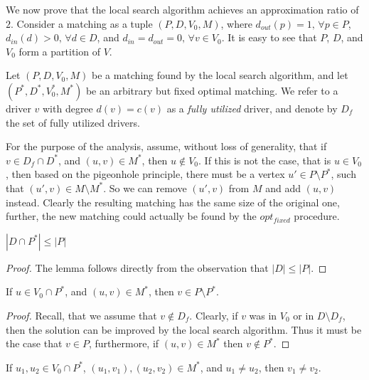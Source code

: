 We now prove that the local search algorithm achieves an approximation ratio of
$2$.
Consider a matching as a tuple $(P, D, V_0, M)$, 
where $d_{out}(p) = 1, \, \forall p \in P$,
$d_{in}(d) > 0, \, \forall d \in D$,
and $d_{in} = d_{out} = 0, \, \forall v \in V_0$.
It is easy to see that $P$, $D$, and $V_0$ form a partition of $V$.

Let $(P, D, V_0, M)$ be a matching found by the local search algorithm, and let
$(P^*, D^*, V^*_0, M^*)$ be an arbitrary but fixed optimal matching.
We refer to a driver $v$ with degree $d(v) = c(v)$ as a \emph{fully utilized}
driver, and denote by $D_f$ the set of fully utilized drivers.

For the purpose of the analysis, assume, without loss of generality, that
if $v \in D_f \cap D^*$, and $(u, v) \in M^*$, then $u \notin V_0$.
If this is not the case, that is $u \in V_0$, then based on the pigeonhole principle,
there must be a vertex $u' \in P \setminus P^*$, such that $(u', v) \in M \setminus M^*$.
So we can remove $(u', v)$ from $M$ and add $(u, v)$ instead.
Clearly the resulting matching has the same size of the original one,
further, the new matching could actually be found by the $opt_{fixed}$ procedure.


\begin{lemma}
\label{lm:dleqp}
$|D \cap P^*| \leq |P|$
\end{lemma}

\begin{proof}
The lemma follows directly from the observation that 
${|D| \leq |P|}$.
\end{proof}

\begin{lemma}
\label{lm:v_in_p}
If $u \in V_0 \cap P^*$, and $(u, v) \in M^*$, then $v \in P \setminus P^*$.
\end{lemma}

\begin{proof}
Recall, that we assume that $v \notin D_f$.
Clearly, if $v$ was in $V_0$ or in $D \setminus D_f$, 
then the solution can be improved by the local search algorithm.
Thus it must be the case that $v \in P$, furthermore, 
if $(u, v) \in M^*$ then $v \notin P^*$. 
\end{proof}

\begin{lemma}
\label{lm:u1nequ2thenv1neqv2}
If $u_1, u_2 \in V_0 \cap P^*$, 
$(u_1, v_1), (u_2, v_2) \in M^*$, 
and $u_1 \neq u_2$,
then $v_1 \neq v_2$.
\end{lemma}


